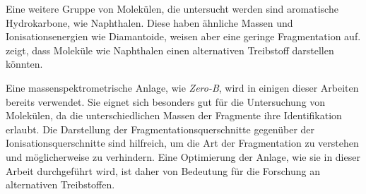 Eine weitere Gruppe von Molekülen, die untersucht werden sind aromatische Hydrokarbone, wie Naphthalen. Diese haben ähnliche Massen und Ionisationsenergien wie Diamantoide, weisen aber eine geringe Fragmentation auf. \cite{hydrocarbons} zeigt, dass Moleküle wie Naphthalen einen alternativen Treibstoff darstellen könnten.

Eine massenspektrometrische Anlage, wie \textit{Zero-B}, wird in einigen dieser Arbeiten bereits verwendet. Sie eignet sich besonders gut für die Untersuchung von Molekülen, da die unterschiedlichen Massen der Fragmente ihre Identifikation erlaubt. Die Darstellung der Fragmentationsquerschnitte gegenüber der Ionisationsquerschnitte sind hilfreich, um die Art der Fragmentation zu verstehen und möglicherweise zu verhindern. Eine Optimierung der Anlage, wie sie in dieser Arbeit durchgeführt wird, ist daher von  Bedeutung für die Forschung an alternativen Treibstoffen.

